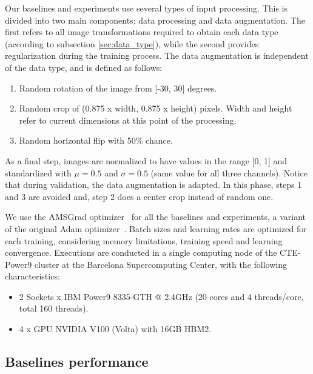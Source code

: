 \documentclass{article}
\begin{document}
Our baselines and experiments use several types of input processing. This is divided into two main components: data processing and data augmentation. The first refers to all image transformations required to obtain each data type (according to subsection \ref{sec:data_type}), while the second provides regularization during the training process. The data augmentation is independent of the data type, and is defined as follows:
\begin{enumerate}
    \item Random rotation of the image from [-30, 30] degrees.
    \item Random crop of (0.875 x width, 0.875 x height) pixels. Width and height refer to current dimensions at this point of the processing.
    \item Random horizontal flip with 50\% chance.
\end{enumerate}

As a final step, images are normalized to have values in the range [0, 1] and standardized with $\mu = 0.5$ and $\sigma = 0.5$ (same value for all three channels). Notice that during validation, the data augmentation is adapted. In this phase, steps 1 and 3 are avoided and, step 2 does a center crop instead of random one.

We use the AMSGrad optimizer~\citep{reddi2019convergence} for all the baselines and experiments, a variant of the original Adam optimizer~\citep{kingma2014adam}. Batch sizes and learning rates are optimized for each training, considering memory limitations, training speed and learning convergence. Executions are conducted in a single computing node of the CTE-Power9 cluster at the Barcelona Supercomputing Center, with the following characteristics:
\begin{itemize}
    \item 2 Sockets x IBM Power9 8335-GTH @ 2.4GHz (20 cores and 4 threads/core, total 160 threads).
    \item 4 x GPU NVIDIA V100 (Volta) with 16GB HBM2.
\end{itemize}

\subsection{Baselines performance} \label{sec:baselines_perf}
\end{document}
